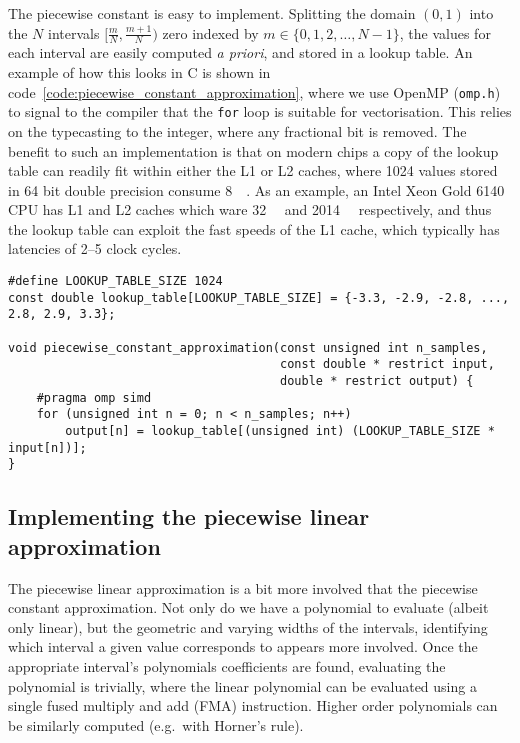 \documentclass[manuscript,review]{acmart}
\begin{document}
The piecewise constant is easy to implement. Splitting the domain $ (0, 1) $ into the $ N $ intervals $ [\tfrac{m}{N}, \tfrac{m+1}{N}) $ zero indexed by $ m \in \{0,1,2,\ldots,N-1\}$, the values for each interval are easily computed \textit{a priori}, and stored in a lookup table. An example of how this looks in C is shown in code~\ref{code:piecewise_constant_approximation}, where we use OpenMP (\texttt{omp.h}) to signal to the compiler that the \texttt{for} loop is suitable for vectorisation. This relies on the typecasting to the integer, where any fractional bit is removed. The benefit to such an implementation is that on modern chips a copy of the lookup table can readily fit within either the L1 or L2 caches, where 1024 values stored in 64 bit double precision consume \SI{8}{\kilo\byte}. As an example, an Intel Xeon Gold 6140 CPU has L1 and L2 caches which ware \SI{32}{\kilo\byte} and \SI{2014}{\kilo\byte} respectively, and thus the lookup table can exploit the fast speeds of the L1 cache, which typically has latencies of 2--5 clock cycles. 

\begin{lstfloat}[htb]
\begin{lstlisting}[style=C, caption={C implementation of the piecewise constant approximation.}, label={code:piecewise_constant_approximation}]
#define LOOKUP_TABLE_SIZE 1024
const double lookup_table[LOOKUP_TABLE_SIZE] = {-3.3, -2.9, -2.8, ..., 2.8, 2.9, 3.3};

void piecewise_constant_approximation(const unsigned int n_samples, 
                                      const double * restrict input, 
                                      double * restrict output) {
    #pragma omp simd
    for (unsigned int n = 0; n < n_samples; n++) 
        output[n] = lookup_table[(unsigned int) (LOOKUP_TABLE_SIZE * input[n])];
}
\end{lstlisting}
\end{lstfloat}

\subsection{Implementing the piecewise linear approximation}

The piecewise linear approximation is a bit more involved that the piecewise constant approximation. Not only do we have a polynomial to evaluate (albeit only linear), but the geometric and varying widths of the intervals, identifying which interval a given value corresponds to appears more involved. Once the appropriate interval's polynomials coefficients are found, evaluating the polynomial is trivially, where the linear polynomial can be evaluated using a single fused multiply and add (FMA) instruction. Higher order polynomials can be similarly computed (e.g.\ with Horner's rule). 
\end{document}
